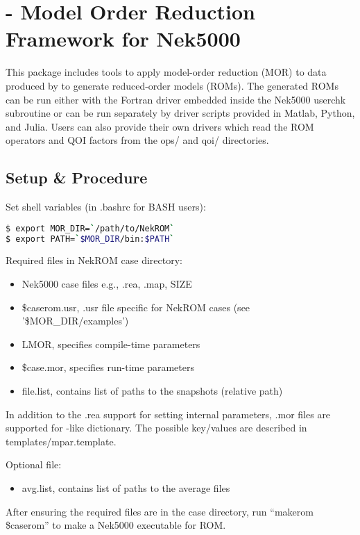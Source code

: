 \section{\href{https://github.com/Nek5000/NekROM}{\color{blue}{NekROM}} - Model Order Reduction Framework for Nek5000}
\noindent 
This package includes tools to apply model-order reduction (MOR) to data
produced by \href{https://github.com/Nek5000/Nek5000}{\color{blue}{Nek5000}} to
generate reduced-order models (ROMs). The generated ROMs can be run either with
the Fortran driver embedded inside the Nek5000 userchk subroutine or can be run
separately by driver scripts provided in Matlab, Python, and Julia. Users can
also provide their own drivers which read the ROM operators and QOI factors
from the ops/ and qoi/ directories.

\subsection{Setup \& Procedure}

\noindent
Set shell variables (in .bashrc for BASH users):
\begin{lstlisting}[language=bash]
$ export MOR_DIR=`/path/to/NekROM`
$ export PATH=`$MOR_DIR/bin:$PATH`
\end{lstlisting}

Required files in NekROM case directory:
\begin{itemize}
\item Nek5000 case files e.g., .rea, .map, SIZE
\item \$caserom.usr, .usr file specific for NekROM cases (see '\$MOR\_DIR/examples')
\item LMOR,      specifies compile-time parameters
\item \$case.mor, specifies run-time parameters
\item file.list, contains list of paths to the snapshots (relative path)
\end{itemize}
In addition to the .rea support for setting internal parameters, .mor files are
supported for
\href{https://nek5000.github.io/NekDoc/problem_setup/case_files}{\color{blue}{par}}-like
dictionary. The possible key/values are described in templates/mpar.template.

Optional file:
\begin{itemize}
\item avg.list, contains list of paths to the average files
\end{itemize}
After ensuring the required files are in the case directory, run 
``makerom \$caserom'' to make a Nek5000 executable for ROM.

